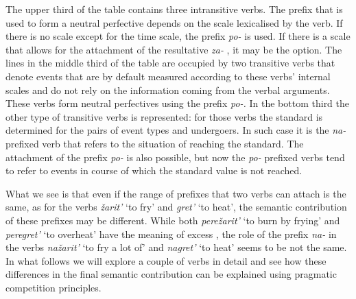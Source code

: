 The upper third of the table contains three intransitive verbs. The prefix that is used to form a neutral perfective   depends on the scale lexicalised by the verb. If there is no scale except for the time scale, the prefix \textit{po-}   is used. If there is a scale that allows for the attachment of the resultative  \textit{za-}  , it may be the option. The lines in the middle third of the table are occupied by two transitive verbs  that denote events that are by default measured according to these verbs' internal  scales and do not rely on the information coming from the verbal arguments. These verbs form neutral perfectives   using the prefix \textit{po-.} In the bottom third the other type of transitive verbs  is represented: for those verbs the standard is determined for the pairs of event types and undergoers. In such case it is the \textit{na-}  prefixed verb that refers to the situation of reaching the standard. The attachment of the prefix \textit{po-}   is also possible, but now the \textit{po-}  prefixed verbs tend to refer to events in course of which the standard value is not reached.

What we see is that even if the range of prefixes that two verbs can attach is the same, as for the verbs \textit{\v{z}arit'} `to fry' and \textit{gret'} `to heat', the semantic contribution of these prefixes may be different. While both \textit{pere\v{z}arit'} `to burn by frying' and \textit{peregret'} `to overheat' have the meaning of excess , the role of the prefix \textit{na-}   in the verbs \textit{na\v{z}arit'} `to fry a lot of' and \textit{nagret'} `to heat' seems to be not the same. In what follows we will explore a couple of verbs in detail and see how these differences in the final semantic contribution can be explained using pragmatic competition principles.

